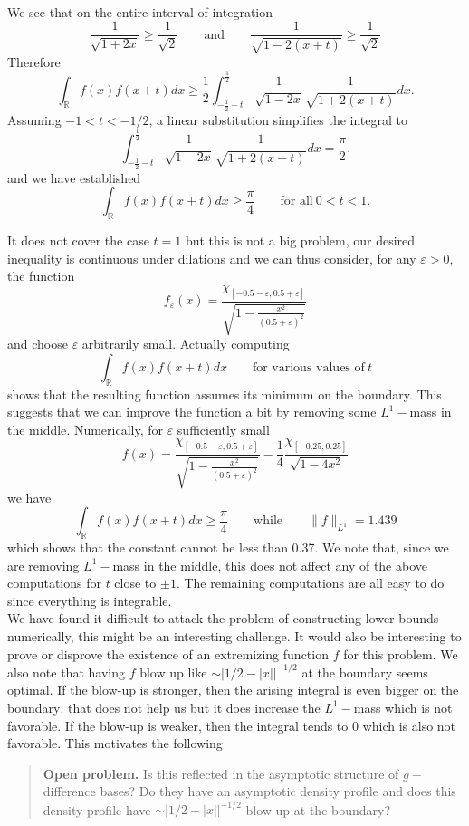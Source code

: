 \documentclass{amsart}
\theoremstyle{remark}
\begin{document}
{\begin{align*}
 \end{align*}
We see that on the entire interval of integration
$$ \frac{1}{\sqrt{1+2x}} \geq \frac{1}{\sqrt{2}} \qquad \mbox{and} \qquad  \frac{1}{\sqrt{1-2(x+t)}} \geq \frac{1}{\sqrt{2}}$$
Therefore
$$  \int_{\mathbb{R}}{ f(x) f(x+t) dx}  \geq \frac{1}{2}  \int_{-\frac{1}{2} - t}^{\frac12}{  \frac{1}{\sqrt{1-2x}} \frac{1}{\sqrt{1+2(x+t)}} dx}.$$
Assuming $-1 < t < -1/2$, a linear substitution simplifies the integral to
$$ \int_{-\frac{1}{2} - t}^{\frac12}{  \frac{1}{\sqrt{1-2x}} \frac{1}{\sqrt{1+2(x+t)}} dx} = \frac{\pi}{2}.$$
and we have established 
$$  \int_{\mathbb{R}}{ f(x) f(x+t) dx} \geq \frac{\pi}{4} \qquad \mbox{for all}~0 < t < 1.$$

 It does not cover the case $t=1$ but this is not a big problem, our desired inequality is continuous under dilations
and we can thus consider, for any $\varepsilon > 0$, the function
$$ f_{\varepsilon}(x) = \frac{\chi_{[-0.5 -\varepsilon,0.5+\varepsilon]}}{\sqrt{1-\frac{x^2}{(0.5+\varepsilon)^2}}}$$
and choose $\varepsilon$ arbitrarily small. Actually computing
$$  \int_{\mathbb{R}}{ f(x) f(x+t) dx} \qquad \mbox{for various values of}~t$$
shows that the resulting function assumes its minimum on the boundary. This suggests that we can improve the function
a bit by removing some $L^1-$mass in the middle.
Numerically, for $\varepsilon$ sufficiently small
$$ f(x) = \frac{\chi_{[-0.5-\varepsilon,0.5+\varepsilon]}}{\sqrt{1-\frac{x^2}{(0.5 + \varepsilon)^2}}} - \frac{1}{4}\frac{\chi_{[-0.25,0.25]}}{\sqrt{1-4x^2}}  $$
we have
$$  \int_{\mathbb{R}}{f(x)f(x+t)dx} \geq \frac{\pi}{4} \qquad \mbox{while} \qquad \|f\|_{L^1}= 1.439$$
which shows that the constant cannot be less than 0.37. We note that, since we are removing $L^1-$mass in the middle, this does not affect any 
of the above computations for $t$ close to $\pm 1$. The remaining computations are all easy to do since everything is integrable.\\


We have found it difficult to attack the problem of constructing lower bounds numerically, this might be an interesting challenge. It would also be interesting to prove or disprove the existence of an extremizing function $f$ for this problem. We also note that having $f$ blow up like $\sim |1/2 - |x||^{-1/2}$ at the boundary seems optimal. If the blow-up is stronger, then the arising integral
is even bigger on the boundary: that does not help us but it does increase the $L^1-$mass which is not favorable. If the blow-up is weaker, then the integral tends to 0 which is also not favorable.
This motivates the following
\begin{quote}
\textbf{Open problem.} Is this reflected in the asymptotic structure of $g-$difference bases? Do they have an asymptotic density profile and does this density profile have $\sim |1/2 - |x||^{-1/2}$ blow-up at the boundary?
\end{quote}


}
\end{document}
